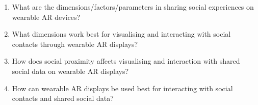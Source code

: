 \begin{enumerate}[label=RQ\arabic*]
    \item{\label{rq:continuum}
    What are the dimensions/factors/parameters in sharing social experiences on wearable AR devices?
    }
    \item{\label{rq:people}
    What dimensions work best for visualising and interacting with social contacts through wearable AR displays?
    }
    \item{\label{rq:data}
    How does social proximity affects visualising and interaction with shared social data on wearable AR displays?
    }
    \item{\label{rq:interaction}
    How can wearable AR displays be used best for interacting with social contacts and shared social data?
    }
\end{enumerate}

